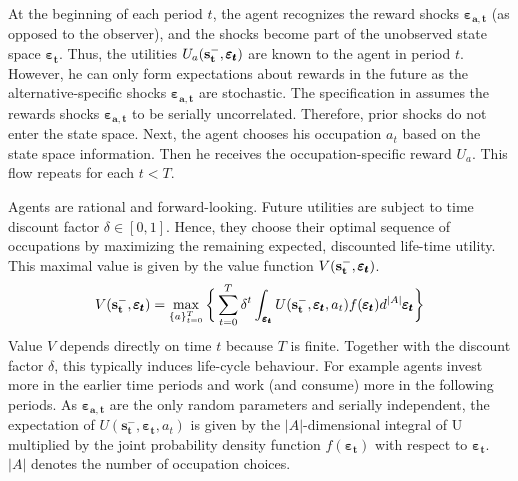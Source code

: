 \noindent
At the beginning of each period $t$, the agent recognizes the reward shocks $\pmb{\varepsilon_{a,t}}$ (as opposed to the observer), and the shocks become part of the unobserved state space $\pmb{\varepsilon_t}$. Thus, the utilities $U_a(\bold{s_t^-}, \pmb{\varepsilon_t})$ are known to the agent in period $t$. However, he can only form expectations about rewards in the future as the alternative-specific shocks $\pmb{\varepsilon_{a,t}}$ are stochastic. The specification in \cite{Keane.1994} assumes the rewards shocks $\pmb{\varepsilon_{a,t}}$ to be serially uncorrelated. Therefore, prior shocks do not enter the state space. Next, the agent chooses his occupation $a_t$ based on the state space information. Then he receives the occupation-specific reward $U_a$. This flow repeats for each $t < T$.

Agents are rational and forward-looking. Future utilities are subject to time discount factor $\delta  \in [0,1]$. Hence, they choose their optimal sequence of occupations by maximizing the remaining expected, discounted life-time utility. This maximal value is given by the value function $V(\bold{s_t^-}, \pmb{\varepsilon_t})$.
\begin{align}
V(\bold{s_t^-}, \pmb{\varepsilon_t}) = \max_{\{a\}_{t=0}^T} \bigg\{ \sum_{t=0}^T \delta^t \int_{\pmb{\varepsilon_t}} U(\bold{s_{t}^{-}},\pmb{\varepsilon_{t}}, a_{t}) f(\pmb{\varepsilon_{t}})d^{|A|}\pmb{\varepsilon_{t}}\bigg\}
\end{align}
Value $V$ depends directly on time $t$ because $T$ is finite. Together with the discount factor $\delta$, this typically induces life-cycle behaviour. For example agents invest more in the earlier time periods and work (and consume) more in the following periods. As $\pmb{\varepsilon_{a,t}}$ are the only random parameters and serially independent, the expectation of $U(\bm{s_{t}^{-}},\pmb{\varepsilon_{t}}, a_{t})$ is given by the $|A|$-dimensional integral of U multiplied by the joint probability density function $f(\pmb{\varepsilon_{t}})$ with respect to $\pmb{\varepsilon_{t}}$. $|A|$ denotes the number of occupation choices.

